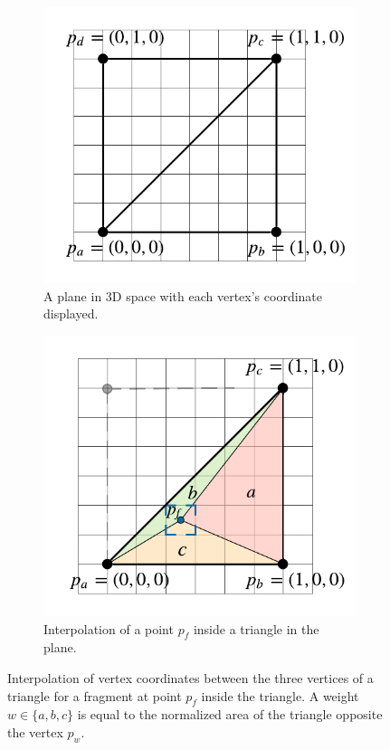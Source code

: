 \begin{figure}[h]
\centering
\begin{subfigure}{.4\textwidth}
    \centering
    \includegraphics[width=\linewidth]{img/background/InterpolationLeft.pdf}
    \caption{A plane in 3D space with each vertex's coordinate displayed.}
    \label{fig:InterpolationLeft}
\end{subfigure}\hspace{0.6cm}
\begin{subfigure}{.4\textwidth}
    \centering
    \includegraphics[width=\linewidth]{img/background/InterpolationRight.pdf}
    \caption{Interpolation of a point $p_f$ inside a triangle in the plane.}
    \label{fig:InterpolationRight}
\end{subfigure}
\caption{
Interpolation of vertex coordinates between the three vertices of a triangle for a fragment at point $p_f$ inside the triangle. A weight $w \in \{a,b,c\}$ is equal to the normalized area of the triangle opposite the vertex $p_w$.
}
\label{fig:Interpolation}
\end{figure}


